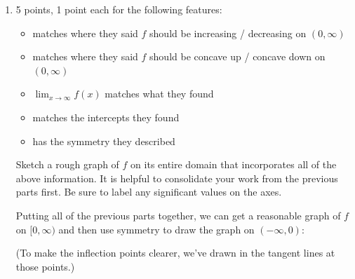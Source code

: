 \documentclass{article}
\begin{document}
\begin{enumerate}[resume]
\begin{enumerate}[resume]
  \item

    \begin{grading}
      5 points, 1 point each for the following features:
      \begin{itemize}[nosep]
      \item matches where they said $f$ should be increasing / decreasing on $(0, \infty)$
      \item matches where they said $f$ should be concave up / concave down on $(0, \infty)$
      \item $\displaystyle \lim_{x \to \infty} f(x)$ matches what they found 
      \item matches the intercepts they found
      \item has the symmetry they described
      \end{itemize}
    \end{grading}

    \begin{problem}[\vfill\newpage]
      Sketch a rough graph of $f$ on its entire domain that incorporates all of the above information. It is  helpful to consolidate your work from the previous parts first. Be sure to label any significant values on the axes. 
    \end{problem}

    \begin{solution}
      Putting all of the previous parts together, we can get a reasonable graph of $f$ on $[0, \infty)$ and then use symmetry to draw the graph on $(-\infty, 0)$:
      \begin{center}
      \end{center}
      (To make the inflection points clearer, we've drawn in the tangent
      lines at those points.)      
    \end{solution}

  \end{enumerate}


\end{enumerate}
\end{document}
